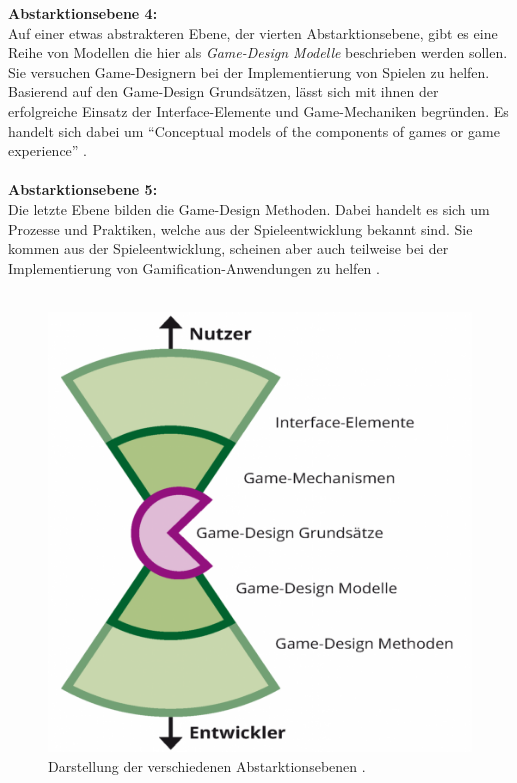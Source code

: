 \documentclass[a4paper,12pt]{scrartcl}
\begin{document}
\textbf{Abstarktionsebene 4:}
\\
Auf einer etwas abstrakteren Ebene, der vierten Abstarktionsebene, gibt es eine Reihe von Modellen die hier als \textit{Game-Design Modelle} beschrieben werden sollen. Sie versuchen Game-Designern bei der Implementierung von Spielen zu helfen. Basierend auf den Game-Design Grundsätzen, lässt sich mit ihnen der erfolgreiche Einsatz der Interface-Elemente und Game-Mechaniken begründen. Es handelt sich dabei um \enquote{Conceptual models of the components of games or game experience} \cite{Deterding2011}.
\\\\
\textbf{Abstarktionsebene 5:}\\
Die letzte Ebene bilden die Game-Design Methoden. Dabei handelt es sich um Prozesse und Praktiken, welche aus der Spieleentwicklung bekannt sind. Sie kommen aus der Spieleentwicklung, scheinen aber auch teilweise bei der Implementierung von Gamification-Anwendungen zu helfen \cite{GameElemente2018}.
\\\\
\begin{figure}[h!]
\begin{center}
\includegraphics[scale = 0.3]{Bilder/GameElemente.eps}
\caption{Darstellung der verschiedenen Abstarktionsebenen \cite{GameElemente2018}.}
\label{GameElementeBild}
\end{center}
\end{figure}
\end{document}
